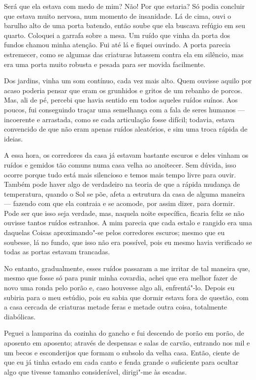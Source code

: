 Será que ela estava com medo de mim? Não! Por que estaria? Só podia concluir que estava muito nervosa, num momento de
insanidade. Lá de cima, ouvi o barulho alto de uma porta batendo, então soube que ela buscava refúgio em seu quarto.
Coloquei a garrafa sobre a mesa. Um ruído que vinha da porta dos fundos chamou minha atenção. Fui até lá e fiquei
ouvindo. A porta parecia estremecer, como se algumas das criaturas lutassem contra ela em silêncio, mas era uma
porta muito robusta e pesada para ser movida facilmente.

Dos jardins, vinha um som contínuo, cada vez mais alto. Quem ouvisse aquilo por acaso poderia pensar que eram os
grunhidos e gritos de um rebanho de porcos. Mas, ali de pé, percebi que havia sentido em todos aqueles ruídos suínos.
Aos poucos, fui conseguindo traçar uma semelhança com a fala de seres humanos --- incoerente e arrastada, como se cada
articulação fosse difícil; todavia, estava convencido de que não eram apenas ruídos aleatórios, e sim uma troca rápida
de ideias.

A essa hora, os corredores da casa já estavam bastante escuros e deles vinham os ruídos e gemidos tão comuns numa casa
velha ao anoitecer. Sem dúvida, isso ocorre porque tudo está mais silencioso e temos mais tempo livre para ouvir.
Também pode haver algo de verdadeiro na teoria de que a rápida mudança de temperatura, quando o Sol se põe, afeta a
estrutura da casa de alguma maneira --- fazendo com que ela contraia e se acomode, por assim dizer, para dormir. Pode ser
que isso seja verdade, mas, naquela noite específica, ficaria feliz se não ouvisse tantos ruídos estranhos. A mim
parecia que cada estalo e rangido era uma daquelas Coisas aproximando"-se pelos corredores escuros; mesmo que eu
soubesse, lá no fundo, que isso não era possível, pois eu mesmo havia verificado se todas as portas estavam trancadas.

No entanto, gradualmente, esses ruídos passaram a me irritar de tal maneira que, mesmo que fosse só para punir minha
covardia, achei que era melhor fazer de novo uma ronda pelo porão e, caso houvesse algo ali, enfrentá"-lo. Depois eu
subiria para o meu estúdio, pois eu sabia que dormir estava fora de questão, com a casa cercada de criaturas metade
feras e metade outra coisa, totalmente diabólicas.

Peguei a lamparina da cozinha do gancho e fui descendo de porão em porão, de aposento em aposento; através de
despensas e salas de carvão, entrando nos mil e um becos e esconderijos que formam o subsolo da velha casa. Então,
ciente de que eu já tinha estado em cada canto e fenda grande o suficiente para ocultar algo que tivesse tamanho
considerável, dirigi"-me às escadas.

